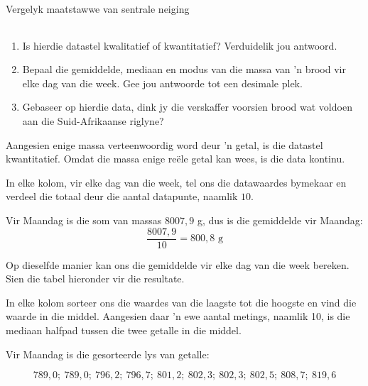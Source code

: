 \begin{wex}{
Vergelyk maatstawwe van sentrale neiging
}
{\begin{center}
\begin{tabular}{|c|c|c|c|c|c|c|}
      \end{tabular}
    \end{center}
\begin{minipage}{0.9\textwidth}
    \begin{enumerate}[noitemsep, label=\textbf{\arabic*}.]
    \item Is hierdie datastel kwalitatief of kwantitatief? Verduidelik jou antwoord.
    \item Bepaal die gemiddelde, mediaan en modus van die massa van ’n brood vir elke dag van die week. Gee jou antwoorde tot een desimale plek.
    \item Gebaseer op hierdie data, dink jy die verskaffer voorsien brood wat voldoen aan die Suid-Afrikaanse riglyne?
    \end{enumerate}
\end{minipage}
}{

  Aangesien enige massa verteenwoordig word deur ’n getal, is die datastel kwantitatief. Omdat die massa enige reële getal kan wees, is die data kontinu.


 In elke kolom, vir elke dag van die week, tel ons die datawaardes bymekaar en verdeel die totaal deur die aantal datapunte, naamlik $10$.

  Vir Maandag is die som van massas $8007,9$ g, dus is die gemiddelde vir Maandag:
  \begin{equation*}
    \frac{8007,9}{10} = 800,8\mbox{ g}
  \end{equation*}

  Op dieselfde manier kan ons die gemiddelde vir elke dag van die week bereken. Sien die tabel hieronder vir die resultate.


  In elke kolom sorteer ons die waardes van die laagste tot die hoogste en vind die waarde in die middel. Aangesien daar ’n ewe aantal metings, naamlik 10, is die mediaan halfpad tussen die twee getalle in die middel.

  Vir Maandag is die gesorteerde lys van getalle:

  \begin{equation*}
    789,0;\ 789,0;\ 796,2;\ 796,7;\ 801,2;\ 802,3;\ 802,3;\ 802,5;\ 808,7;\ 819,6
  \end{equation*}

}
\end{wex}
